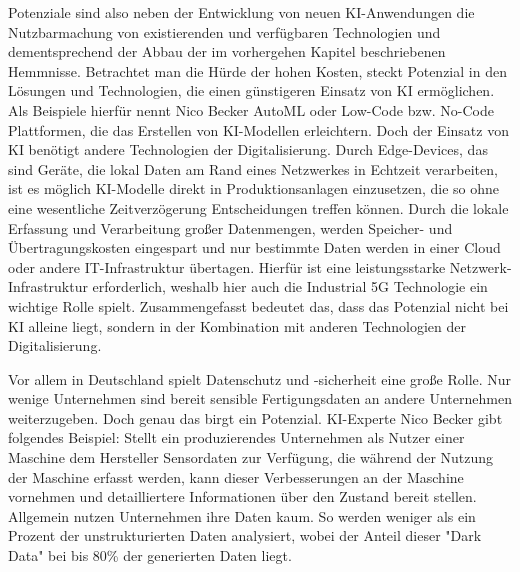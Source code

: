 \documentclass[a4paper,12pt, german]{report}
\begin{document}
Potenziale sind also neben der Entwicklung von neuen KI-Anwendungen die Nutzbarmachung von existierenden und verfügbaren Technologien und dementsprechend der Abbau der im vorhergehen Kapitel beschriebenen Hemmnisse. Betrachtet man die Hürde der hohen Kosten, steckt Potenzial in den Lösungen und Technologien, die einen günstigeren Einsatz von KI ermöglichen. Als Beispiele hierfür nennt Nico Becker AutoML oder Low-Code bzw. No-Code Plattformen, die das Erstellen von KI-Modellen erleichtern. Doch der Einsatz von KI benötigt andere Technologien der Digitalisierung. Durch Edge-Devices, das sind Geräte, die lokal Daten am Rand eines Netzwerkes in Echtzeit verarbeiten, ist es möglich KI-Modelle direkt in Produktionsanlagen einzusetzen, die so ohne eine wesentliche Zeitverzögerung Entscheidungen treffen können. Durch die lokale Erfassung und Verarbeitung großer Datenmengen, werden Speicher- und Übertragungskosten eingespart und nur bestimmte Daten werden in einer Cloud oder andere IT-Infrastruktur übertagen. Hierfür ist eine leistungsstarke Netzwerk-Infrastruktur erforderlich, weshalb hier auch die Industrial 5G Technologie ein wichtige Rolle spielt.\cite{36} Zusammengefasst bedeutet das, dass das Potenzial nicht bei KI alleine liegt, sondern in der Kombination mit anderen Technologien der Digitalisierung.

Vor allem in Deutschland spielt Datenschutz und -sicherheit eine große Rolle. Nur wenige Unternehmen sind bereit sensible Fertigungsdaten an andere Unternehmen weiterzugeben. Doch genau das birgt ein Potenzial. KI-Experte Nico Becker gibt folgendes Beispiel: Stellt ein produzierendes Unternehmen als Nutzer einer Maschine dem Hersteller Sensordaten zur Verfügung, die während der Nutzung der Maschine erfasst werden, kann dieser Verbesserungen an der Maschine vornehmen und detailliertere Informationen über den Zustand bereit stellen.\newline
Allgemein nutzen Unternehmen ihre Daten kaum. So werden weniger als ein Prozent der unstrukturierten Daten analysiert, wobei der Anteil dieser "Dark Data" bei bis 80\% der generierten Daten liegt.\cite{36}
\end{document}
